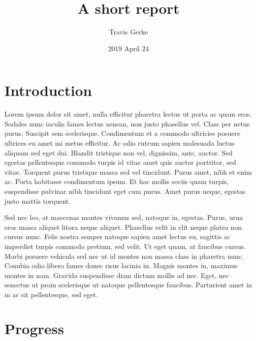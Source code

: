 \documentclass[]{article}
\title{A short report}
\author{Travis Gerke}
\date{2019 April 24}
\begin{document}
\makeatletter
\renewcommand{\maketitle}{\bgroup\vspace*{-2.5cm}\setlength{\parindent}{0pt}
\begin{flushleft}
  \textbf{\@title}
  
  \@author
  
  \@date
  
\end{flushleft}\egroup
}
\makeatother
\maketitle

\hypertarget{introduction}{%
\section{Introduction}\label{introduction}}

Lorem ipsum dolor sit amet, nulla efficitur pharetra lectus ut porta ac
quam eros. Sodales nunc iaculis fames lectus aenean, non justo phasellus
vel. Class per netus purus. Suscipit sem scelerisque. Condimentum et a
commodo ultricies posuere ultrices eu amet mi metus efficitur. Ac odio
rutrum sapien malesuada luctus aliquam sed eget dui. Blandit tristique
non vel, dignissim, ante, auctor. Sed egestas pellentesque commodo
turpis id vitae amet quis auctor porttitor, sed vitae. Torquent purus
tristique massa sed vel tincidunt. Purus amet, nibh et enim ac. Porta
habitasse condimentum ipsum. Et hac mollis sociis quam turpis,
suspendisse pulvinar nibh tincidunt eget cum purus. Amet purus neque,
egestas justo mattis torquent.

Sed nec leo, at maecenas montes vivamus sed, natoque in, egestas. Purus,
urna eros massa aliquet litora neque aliquet. Phasellus velit in elit
neque platea non cursus nunc. Felis nostra semper natoque sapien amet
lectus eu, sagittis ac imperdiet turpis commodo pretium, sed velit. Ut
eget quam, at faucibus cursus. Morbi posuere vehicula sed nec ut id
montes non massa class in pharetra nunc. Conubia odio libero fames donec
risus lacinia in. Magnis montes in, maximus montes in nam. Gravida
suspendisse diam dictum mollis ad nec. Eget, nec senectus ut proin
scelerisque ut natoque pellentesque faucibus. Parturient amet in in ac
sit pellentesque, sed eget.

\hypertarget{progress}{%
\section{Progress}\label{progress}}
\end{document}
